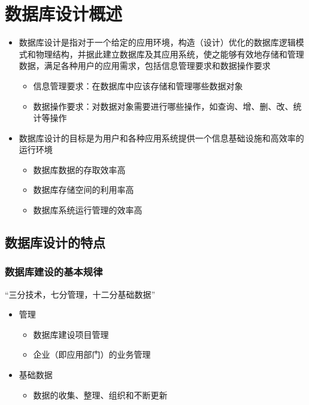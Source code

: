 \section{数据库设计概述}

\begin{itemize}
    \item 数据库设计是指对于一个给定的应用环境，构造（设计）优化的数据库逻辑模式和物理结构，并据此建立数据库及其应用系统，使之能够有效地存储和管理数据，满足各种用户的应用需求，包括信息管理要求和数据操作要求
    \begin{itemize}
        \item 信息管理要求：在数据库中应该存储和管理哪些数据对象
        \item 数据操作要求：对数据对象需要进行哪些操作，如查询、增、删、改、统计等操作
    \end{itemize}
    \item 数据库设计的目标是为用户和各种应用系统提供一个信息基础设施和高效率的运行环境
    \begin{itemize}
        \item 数据库数据的存取效率高
        \item 数据库存储空间的利用率高
        \item 数据库系统运行管理的效率高
    \end{itemize}
\end{itemize}

\subsection{数据库设计的特点}

\subsubsection{数据库建设的基本规律}
“三分技术，七分管理，十二分基础数据”
\begin{itemize}
    \item 管理
    \vspace{-0.8em}
	\begin{multicols}{2}
        \begin{itemize}
            \item 数据库建设项目管理 
            \item 企业（即应用部门）的业务管理
        \end{itemize}
	\end{multicols}
	\vspace{-1em}
    \item 基础数据
    \begin{itemize}
        \item 数据的收集、整理、组织和不断更新
    \end{itemize}
\end{itemize}

